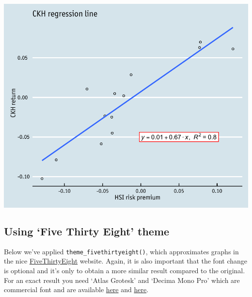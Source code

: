 \begin{center}\includegraphics[width=0.6\linewidth]{11_Linear_Regression_Plot_pdf/lr_16-1} \end{center}

\subsection{\texorpdfstring{Using `Five Thirty Eight'
theme}{Using Five Thirty Eight theme}}\label{using-five-thirty-eight-theme}

Below we've applied \texttt{theme\_fivethirtyeight()}, which
approximates graphs in the nice
\href{http://fivethirtyeight.com/}{FiveThirtyEight} website. Again, it
is also important that the font change is optional and it's only to
obtain a more similar result compared to the original. For an exact
result you need `Atlas Grotesk' and `Decima Mono Pro' which are
commercial font and are available
\href{https://commercialtype.com/catalog/atlas}{here} and
\href{https://www.myfonts.com/fonts/tipografiaramis/decima-mono-pro/}{here}.

